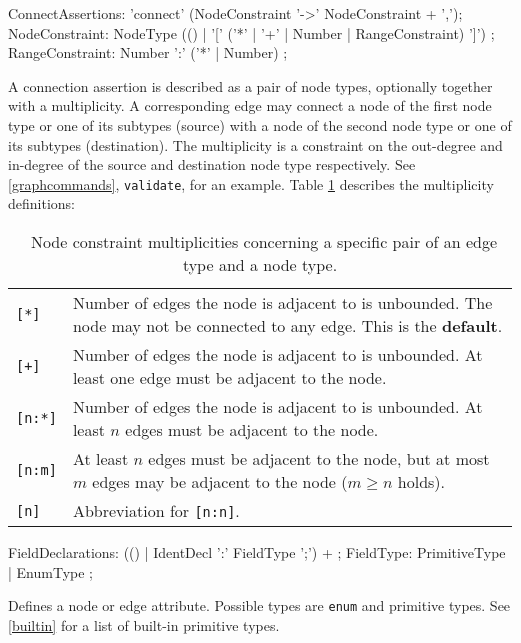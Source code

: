 \begin{rail}  
  ConnectAssertions: 'connect' (NodeConstraint '->' NodeConstraint + ',');
  NodeConstraint: NodeType (() | '[' ('*' | '+' | Number | RangeConstraint) ']') ;
  RangeConstraint: Number ':' ('*' | Number) ;
\end{rail}
A connection assertion is described as a pair of node types, optionally together with a multiplicity. A corresponding edge may connect a node of the first node type or one of its subtypes (source) with a node of the second node type or one of its subtypes (destination). The multiplicity is a constraint on the out-degree and in-degree of the source and destination node type respectively. See \ref{graphcommands}, \texttt{validate}, for an example. Table \ref{multiplicities} describes the multiplicity definitions:
\begin{table}[htbp]
\begin{tabularx}{\linewidth}{|l|X|}\hline
	\texttt{[*]} & Number of edges the node is adjacent to is unbounded. The node may not be connected to any edge. This is the \textbf{default}.\\
	\texttt{[+]} & Number of edges the node is adjacent to is unbounded. At least one edge must be adjacent to the node.\\
	\texttt{[n:*]} & Number of edges the node is adjacent to is unbounded. At least $n$ edges must be adjacent to the node.\\ 
	\texttt{[n:m]} & At least $n$ edges must be adjacent to the node, but at most $m$ edges may be adjacent to the node ($m \geq n$ holds).\\
	\texttt{[n]} & Abbreviation for \texttt{[n:n]}. \\ \hline
\end{tabularx}
\caption{\GrG\ Node constraint multiplicities concerning a specific pair of an edge type and a node type.}
\label{multiplicities}
\end{table}

\begin{rail}    
  FieldDeclarations: (() | IdentDecl ':' FieldType ';') + ;
  FieldType: PrimitiveType | EnumType ; 
\end{rail}
Defines a node or edge attribute. Possible types are \texttt{enum} and primitive types. See \ref{builtin} for a list of built-in primitive types.
